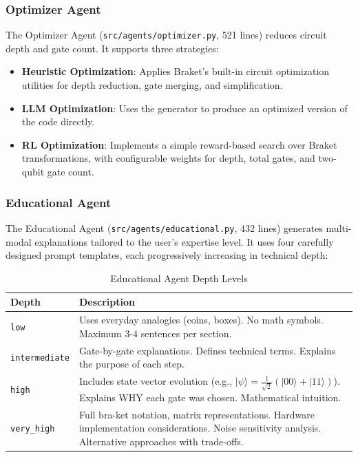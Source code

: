 \documentclass[runningheads]{llncs}
\begin{document}
\subsubsection{Optimizer Agent}
The Optimizer Agent (\texttt{src/agents/optimizer.py}, 521 lines) reduces circuit depth and gate count. It supports three strategies:
\begin{itemize}
    \item \textbf{Heuristic Optimization}: Applies Braket's built-in circuit optimization utilities for depth reduction, gate merging, and simplification.
    \item \textbf{LLM Optimization}: Uses the generator to produce an optimized version of the code directly.
    \item \textbf{RL Optimization}: Implements a simple reward-based search over Braket transformations, with configurable weights for depth, total gates, and two-qubit gate count.
\end{itemize}

\subsubsection{Educational Agent}
The Educational Agent (\texttt{src/agents/educational.py}, 432 lines) generates multi-modal explanations tailored to the user's expertise level. It uses four carefully designed prompt templates, each progressively increasing in technical depth:

\begin{table}[H]
\centering
\caption{Educational Agent Depth Levels}
\label{tab:edu_depth}
\begin{tabular}{lp{8cm}}
\toprule
\textbf{Depth} & \textbf{Description} \\
\midrule
\texttt{low} & Uses everyday analogies (coins, boxes). No math symbols. Maximum 3-4 sentences per section. \\
\texttt{intermediate} & Gate-by-gate explanations. Defines technical terms. Explains the purpose of each step. \\
\texttt{high} & Includes state vector evolution (e.g., $|\psi\rangle = \frac{1}{\sqrt{2}}(|00\rangle + |11\rangle)$). Explains WHY each gate was chosen. Mathematical intuition. \\
\texttt{very\_high} & Full bra-ket notation, matrix representations. Hardware implementation considerations. Noise sensitivity analysis. Alternative approaches with trade-offs. \\
\bottomrule
\end{tabular}
\end{table}
\end{document}
